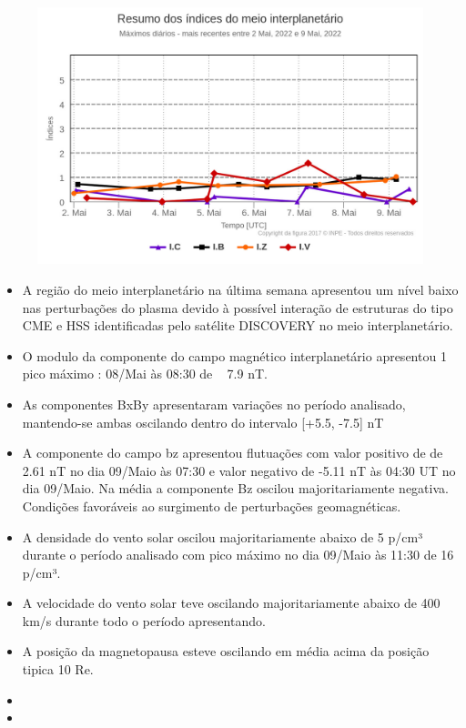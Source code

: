 \documentclass[a4paper, 10pt]{article}
\begin{document}
 \begin{figure}[H]
    \centering
    \includegraphics[width=14cm]{./figures//figureMIIndex.png}
\end{figure}
 \begin{itemize}
 \item A região do meio interplanetário na última  semana apresentou um nível  baixo nas perturbações  do plasma devido à possível interação de estruturas do tipo CME e HSS identificadas pelo satélite DISCOVERY no meio interplanetário.
\item O modulo da componente do campo magnético interplanetário apresentou 1 pico máximo : 08/Mai às 08:30  de ~ 7.9 nT. 
\item As componentes BxBy apresentaram variações no período analisado, mantendo-se ambas oscilando dentro do intervalo [+5.5, -7.5] nT  
\item A componente do campo bz apresentou flutuações com valor positivo de de 2.61 nT no dia 09/Maio às 07:30 e valor negativo de -5.11 nT às 04:30 UT no dia 09/Maio.  Na média  a componente Bz  oscilou majoritariamente negativa. Condições favoráveis ao surgimento de perturbações geomagnéticas.
\item A densidade do vento solar oscilou majoritariamente abaixo de 5 p/cm³ durante o período analisado com pico máximo no dia 09/Maio às 11:30 de 16 p/cm³. 
\item A velocidade do vento solar teve oscilando majoritariamente abaixo de 400 km/s durante todo o período apresentando.
\item A posição da magnetopausa esteve oscilando em média  acima da posição tipica 10 Re.
\item   
\item  
\end{itemize} 
\end{document}
